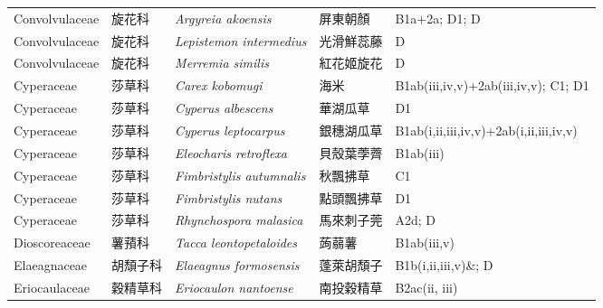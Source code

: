 {\begin{longtable}{p{2.5cm}p{2.5cm}p{4.5cm}p{2.5cm}p{3cm}}
    Convolvulaceae & 旋花科 & \textit{Argyreia akoensis}  & 屏東朝顏 & B1a+2a; D1; D \index{Argyreia@\textit{Argyreia}!akoensis@\textit{akoensis}}  \index{屏東朝顏} \\
    Convolvulaceae & 旋花科 & \textit{Lepistemon intermedius}  & 光滑鮮蕊藤 & D \index{Lepistemon@\textit{Lepistemon}!intermedius@\textit{intermedius}}  \index{光滑鮮蕊藤} \\
    Convolvulaceae & 旋花科 & \textit{Merremia similis}  & 紅花姬旋花 & D \index{Merremia@\textit{Merremia}!similis@\textit{similis}}  \index{紅花姬旋花} \\
    Cyperaceae & 莎草科 & \textit{Carex kobomugi}  & 海米 & B1ab(iii,iv,v)+2ab(iii,iv,v); C1; D1 \index{Carex@\textit{Carex}!kobomugi@\textit{kobomugi}}  \index{海米} \\
    Cyperaceae & 莎草科 & \textit{Cyperus albescens}  & 華湖瓜草 & D1 \index{Cyperus@\textit{Cyperus}!albescens@\textit{albescens}}  \index{華湖瓜草} \\
    Cyperaceae & 莎草科 & \textit{Cyperus leptocarpus}  & 銀穗湖瓜草 & B1ab(i,ii,iii,iv,v)+2ab(i,ii,iii,iv,v) \index{Cyperus@\textit{Cyperus}!leptocarpus@\textit{leptocarpus}}  \index{銀穗湖瓜草} \\
    Cyperaceae & 莎草科 & \textit{Eleocharis retroflexa}  & 貝殼葉荸薺 & B1ab(iii) \index{Eleocharis@\textit{Eleocharis}!retroflexa@\textit{retroflexa}}  \index{貝殼葉荸薺} \\
    Cyperaceae & 莎草科 & \textit{Fimbristylis autumnalis}  & 秋飄拂草 & C1 \index{Fimbristylis@\textit{Fimbristylis}!autumnalis@\textit{autumnalis}}  \index{秋飄拂草} \\
    Cyperaceae & 莎草科 & \textit{Fimbristylis nutans}  & 點頭飄拂草 & D1 \index{Fimbristylis@\textit{Fimbristylis}!nutans@\textit{nutans}}  \index{點頭飄拂草} \\
    Cyperaceae & 莎草科 & \textit{Rhynchospora malasica}  & 馬來刺子莞 & A2d; D \index{Rhynchospora@\textit{Rhynchospora}!malasica@\textit{malasica}}  \index{馬來刺子莞} \\
    Dioscoreaceae & 薯蕷科 & \textit{Tacca leontopetaloides}  & 蒟蒻薯 & B1ab(iii,v) \index{Tacca@\textit{Tacca}!leontopetaloides@\textit{leontopetaloides}}  \index{蒟蒻薯} \\
    Elaeagnaceae & 胡頹子科 & \textit{Elaeagnus formosensis}  & 蓬萊胡頹子 & B1b(i,ii,iii,v)\&; D \index{Elaeagnus@\textit{Elaeagnus}!formosensis@\textit{formosensis}}  \index{蓬萊胡頹子} \\
    Eriocaulaceae & 穀精草科 & \textit{Eriocaulon nantoense}  & 南投穀精草 & B2ac(ii, iii) \index{Eriocaulon@\textit{Eriocaulon}!nantoense@\textit{nantoense}}  \index{南投穀精草} \\

\end{longtable}}
